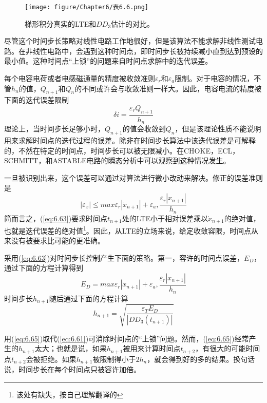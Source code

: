 \begin{figure}[htbp]
\small
    \centering
    \texttt{[image: figure/Chapter6/表6.6.png]}
    \caption{梯形积分真实的LTE和$DD_3$估计的对比。}
    \label{表6.6}
\end{figure}

尽管这个时间步长策略对线性电路工作地很好，但是该算法不能求解非线性测试电路。在非线性电路中，会遇到这种时间点，即时间步长被持续减小直到达到预设的最小值。这种时间点“上锁”的问题来自时间点求解中的迭代误差。

每个电容电荷或者电感磁通量的精度被收敛准则$\varepsilon_r$和$\varepsilon_a$限制。对于电容的情况，不管$h_n$的值，$Q_{n+1}$和$Q_n$的不同或许会与收敛准则一样大。因此，电容电流的精度被下面的迭代误差限制
\begin{equation}
    \delta i = \frac{\varepsilon_r Q_{n+1}}{h_n}
    \label{eq:6.62}
\end{equation}
理论上，当时间步长足够小时，$Q_{n+1}$的值会收敛到$Q_n$，但是该理论性质不能说明用来求解时间点的迭代过程的误差。除非在时间步长算法中该迭代误差是可解释的，不然在特定的时间点，时间步长可以被无限减小。在CHOKE，ECL，SCHMITT，和ASTABLE电路的瞬态分析中可以观察到这种情况发生。

一旦被识别出来，这个误差可以通过对算法进行微小改动来解决。修正的误差准则是
\begin{equation}
    |\varepsilon_{\dot{x}}| \leq max{\varepsilon_r|\dot{x}_{n+1}|+\varepsilon_a, \frac{\varepsilon_r|x_{n+1}|}{h_n}}
    \label{eq:6.63}
\end{equation}
简而言之，(\ref{eq:6.63})要求时间点$t_{n+1}$处的LTE小于相对误差乘以$\dot{x}_{n+1}$的绝对值，也就是迭代误差的绝对值\footnote{该处有缺失，按自己理解翻译的}。因此，从LTE的立场来说，给定收敛容限，时间点从来没有被要求比可能的更准确。

采用(\ref{eq:6.63})对时间步长控制产生下面的策略。第一，容许的时间点误差，$E_D$，通过下面的方程计算得到
\begin{equation}
    E_D = max{\varepsilon_r|\dot{x}_{n+1}|+\varepsilon_a, \frac{\varepsilon_r|x_{n+1}|}{h_n}}
    \label{eq:6.64}
\end{equation}
时间步长$h_{n+1}$随后通过下面的方程计算
\begin{equation}
    h_{n+1} = \sqrt{\frac{\varepsilon_TE_D}{|DD_3(t_{n+1})|}}
    \label{eq:6.65}
\end{equation}

用(\ref{eq:6.65})取代(\ref{eq:6.61})可消除时间点的“上锁”问题。然而，(\ref{eq:6.65})经常产生的$h_{n+1}$太大；也就是说，如果$h_{n+1}$被用来计算时间点$t_{n+2}$，有很大的可能时间点$t_{n+2}$会被拒绝。如果$h_{n+1}$被限制得小于$2h_n$，就会得到好的多的结果。换句话说，时间步长在每个时间点只被容许加倍。

